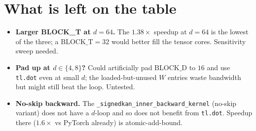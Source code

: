 \documentclass[11pt,a4paper]{article}
\begin{document}
\section{What is left on the table}

\begin{itemize}[leftmargin=*]
  \item \textbf{Larger BLOCK\_T at $d = 64$.} The $1.38\times$ speedup at $d = 64$ is the lowest of the three; a $\mathrm{BLOCK\_T} = 32$ would better fill the tensor cores. Sensitivity sweep needed.
  \item \textbf{Pad up at $d \in \{4, 8\}$?} Could artificially pad $\mathrm{BLOCK\_D}$ to $16$ and use \texttt{tl.dot} even at small $d$; the loaded-but-unused $W$ entries waste bandwidth but might still beat the loop. Untested.
  \item \textbf{No-skip backward.} The \texttt{\_signedkan\_inner\_backward\_kernel} (no-skip variant) does not have a $d$-loop and so does not benefit from \texttt{tl.dot}. Speedup there ($1.6\times$ vs PyTorch already) is atomic-add-bound.
\end{itemize}
\end{document}
